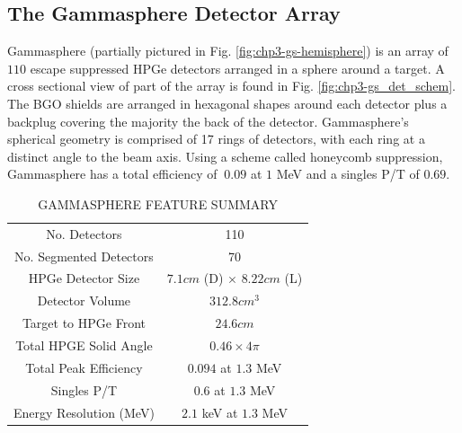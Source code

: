 \subsection{The Gammasphere Detector Array}
\label{ssec:exp-pr-gamma-gammasphere}
Gammasphere (partially pictured in Fig. \ref{fig:chp3-gs-hemisphere}) is an array of $110$ escape suppressed HPGe detectors arranged in a sphere around a target. A cross sectional view of part of the array is found in Fig. \ref{fig:chp3-gs_det_schem}. The BGO shields are arranged in hexagonal shapes around each detector plus a backplug covering the majority the back of the detector. Gammasphere's spherical geometry is comprised of 17 rings of detectors, with each ring at a distinct angle to the beam axis. Using a scheme called honeycomb suppression, Gammasphere has a total efficiency of $~0.09$ at $1$ MeV and a singles P/T of $0.69$.


\begin{table}[hb!]
\caption{GAMMASPHERE FEATURE SUMMARY\label{tbl:gs-summary}}
\begin{center}
\begin{tabular}{|c|c|}
\toprule
No. Detectors             & 110 \\ 
No. Segmented Detectors   & 70 \\ 
HPGe Detector Size        & $7.1 cm$ (D) $\times$ $8.22 cm$ (L) \\
Detector Volume           & $312.8 cm^3$\\
Target to HPGe Front      & $24.6 cm$\\ 
Total HPGE Solid Angle    & $0.46 \times 4\pi$\\ 
Total Peak Efficiency     & $0.094$ at $1.3$ MeV\\ 
Singles P/T               & $0.6$ at $1.3$ MeV\\ 
Energy Resolution (MeV)   & $2.1$ keV at $1.3$ MeV \\ 
\bottomrule
\end{tabular}
\end{center}
\end{table}

